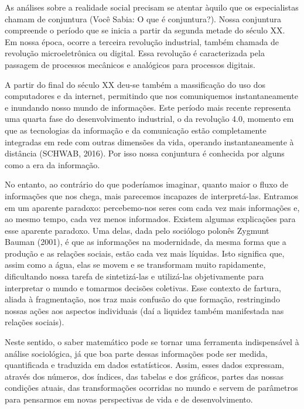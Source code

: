 
As análises sobre a realidade social precisam se atentar àquilo que os especialistas chamam de conjuntura (Você Sabia: O que é conjuntura?). Nossa conjuntura compreende o período que se inicia a partir da segunda metade do século XX. Em nossa época, ocorre a terceira revolução industrial, também chamada de revolução microeletrônica ou digital. Essa revolução é caracterizada pela passagem de processos mecânicos e analógicos para processos digitais.

A partir do final do século XX deu-se também a massificação do uso dos computadores e da internet, permitindo que nos comuniquemos instantaneamente e inundando nosso mundo de informações. Este período mais recente representa uma quarta fase do desenvolvimento industrial, o da revolução 4.0, momento em que as tecnologias da informação e da comunicação estão completamente integradas em rede com outras dimensões da vida, operando instantaneamente à distância (SCHWAB, 2016). Por isso nossa conjuntura é conhecida por alguns como a era da informação.

No entanto, ao contrário do que poderíamos imaginar, quanto maior o fluxo de informações que nos chega, mais parecemos incapazes de interpretá-las. Entramos em um aparente paradoxo: percebemo-nos seres com cada vez mais informações e, ao mesmo tempo, cada vez menos informados. Existem algumas explicações para esse aparente paradoxo. Uma delas, dada pelo sociólogo polonês Zygmunt Bauman (2001), é que as informações na modernidade, da mesma forma que a produção e as relações sociais, estão cada vez mais líquidas. Isto significa que, assim como a água, elas se movem e se transformam muito rapidamente, dificultando nossa tarefa de sintetizá-las e utilizá-las objetivamente para interpretar o mundo e tomarmos decisões coletivas. Esse contexto de fartura, aliada à fragmentação, nos traz mais confusão do que formação, restringindo nossas ações aos aspectos individuais (daí a liquidez também manifestada nas relações sociais).

Neste sentido, o saber matemático pode se tornar uma ferramenta indispensável à análise sociológica, já que boa parte dessas informações pode ser medida, quantificada e traduzida em dados estatísticos. Assim, esses dados expressam, através dos números, dos índices, das tabelas e dos gráficos, partes das nossas condições atuais, das transformações ocorridas no mundo e servem de parâmetros para pensarmos em novas perspectivas de vida e de desenvolvimento.

